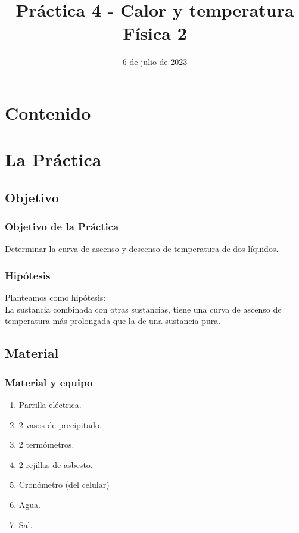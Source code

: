 \documentclass[14pt]{beamer}
\title{\Large{Práctica 4 - Calor y temperatura} \\ \normalsize{Física 2}}
\date{6 de julio de 2023}
\begin{document}
\maketitle

\section*{Contenido}

\section{La Práctica}
\subsection{Objetivo}

\begin{frame}
\frametitle{Objetivo de la Práctica}
Determinar la curva de ascenso y descenso de temperatura de dos líquidos.
\end{frame}
\begin{frame}
\frametitle{Hipótesis}
Planteamos como hipótesis:
\\
\pause
La sustancia combinada con otras sustancias, tiene una curva de ascenso de temperatura más prolongada que la de una sustancia pura.
\end{frame}

\subsection{Material}

\begin{frame}
\frametitle{Material y equipo}
\begin{enumerate}[<+->]
\item Parrilla eléctrica.
\item 2 vasos de precipitado.
\item 2 termómetros.
\item 2 rejillas de asbesto.
\item Cronómetro (del celular)
\item Agua.
\item Sal.
\end{enumerate}
\end{frame}
\end{document}
